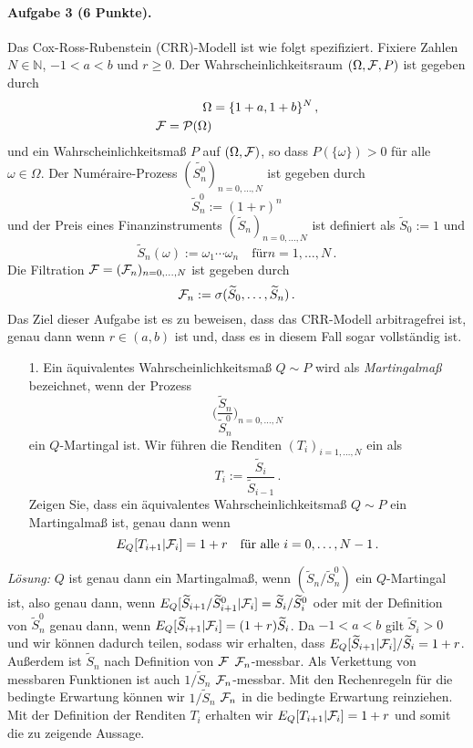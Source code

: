 \documentclass{article}
\begin{document}
\paragraph{Aufgabe 3 \textnormal{(6 Punkte)}.}
Das Cox-Ross-Rubenstein (CRR)-Modell ist wie folgt spezifiziert.
Fixiere Zahlen $N\in\mathbb{N}$, $-1<a<b$ und $r\geq0$.
Der Wahrscheinlichkeitsraum $(\Omega,{\cal F},P)$ ist gegeben durch
\begin{align*}
  \Omega&=\{1+a,1+b\}^N\,,\\
  {\cal F}={\cal P}(\Omega)
\end{align*}
und ein Wahrscheinlichkeitsmaß $P$ auf $(\Omega,{\cal F})$, so dass $P(\{\omega\})>0$ für alle $\omega\in\Omega$.
Der Numéraire-Prozess $(\widetilde{S_n^0})_{n=0,\dots,N}$ ist gegeben durch
\[
  \widetilde{S}_n^0:=(1+r)^n
\]
und der Preis eines Finanzinstruments $(\widetilde{S}_n)_{n=0,\dots,N}$ ist definiert als $\widetilde{S}_0:=1$ und
\[
  \widetilde{S}_n(\omega):=\omega_1\cdots\omega_n\quad\text{für}n=1,\dots,N\,.
\]
Die Filtration ${\cal F}=({\cal F}_n)_{n=0,\dots,N}$ ist gegeben durch
\[
{\cal F}_n:=\sigma(\widetilde{S}_0,\dots,\widetilde{S}_n)\,.
\]
Das Ziel dieser Aufgabe ist es zu beweisen, dass das CRR-Modell arbitragefrei ist, genau dann wenn $r\in(a,b)$ ist und, dass es in diesem Fall sogar vollständig ist.
\begin{itemize}
\item [1.] Ein äquivalentes Wahrscheinlichkeitsmaß $Q\sim P$ wird als \emph{Martingalmaß} bezeichnet, wenn der Prozess
  \[\biggl(\frac{\widetilde{S}_n}{\widetilde{S}_n^0}\biggr)_{n=0,\dots,N}\]
  ein $Q$-Martingal ist.
  Wir führen die Renditen $(T_i)_{i=1,\dots,N}$ ein als
  \[
    T_i:=\frac{\widetilde{S}_i}{\widetilde{S}_{i-1}}\,.
  \]
  Zeigen Sie, dass ein äquivalentes Wahrscheinlichkeitsmaß $Q\sim P$ ein Martingalmaß ist, genau dann wenn
  \[
    E_Q[T_{i+1}|{\cal F}_i]=1+r\quad\text{für alle }i=0,\dots,N-1\,.
  \]
\end{itemize}

\noindent\emph{Lösung: }$Q$ ist genau dann ein Martingalmaß, wenn $(\widetilde{S}_n/\widetilde{S}_n^0)$ ein $Q$-Martingal ist, also genau dann, wenn $E_Q[\widetilde{S}_{i+1}/\widetilde{S}^0_{i+1}|{\cal F}_i]=\widetilde{S}_i/\widetilde{S}^0_i$ oder mit der Definition von $\widetilde{S}^0_n$ genau dann, wenn $E_Q[\widetilde{S}_{i+1}|{\cal F}_i]=(1+r)\widetilde{S}_i$.
Da $-1<a<b$ gilt $\widetilde{S}_i>0$ und wir können dadurch teilen, sodass wir erhalten, dass $E_Q[\widetilde{S}_{i+1}|{\cal F}_i]/\widetilde{S}_i=1+r$.
Außerdem ist $\widetilde{S}_n$ nach Definition von ${\cal F}$ ${\cal F}_n$-messbar.
Als Verkettung von messbaren Funktionen ist auch $1/\widetilde{S}_n$ ${\cal F}_n$-messbar.
Mit den Rechenregeln für die bedingte Erwartung können wir $1/\widetilde{S}_n$ ${\cal F}_n$ in die bedingte Erwartung reinziehen.
Mit der Definition der Renditen $T_i$ erhalten wir $E_Q[T_{i+1}|{\cal F}_i]=1+r$ und somit die zu zeigende Aussage.

\end{document}
